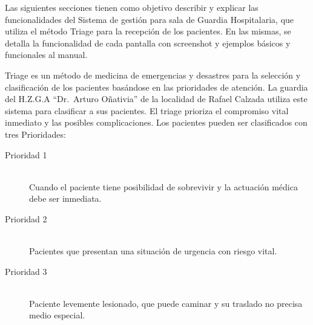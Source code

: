 Las siguientes secciones tienen como objetivo describir y explicar las funcionalidades del Sistema de gestión para sala de Guardia Hospitalaria, que utiliza el método Triage para la recepción de los pacientes. En las mismas, se detalla la funcionalidad de cada pantalla con screenshot y ejemplos básicos y funcionales al manual.

Triage es un método de medicina de emergencias y desastres para la selección y clasificación de los pacientes basándose en las prioridades de atención. La guardia del H.Z.G.A ``Dr.\ Arturo Oñativia'' de la localidad de Rafael Calzada utiliza este sistema para clasificar a sus pacientes. El triage prioriza el compromiso vital inmediato y las posibles complicaciones.
Los pacientes pueden ser clasificados con tres Prioridades:

\begin{description}
\item[Prioridad 1] \mbox{} \\ 
Cuando el paciente tiene posibilidad de sobrevivir y la actuación médica debe ser inmediata.
\item[Prioridad 2] \mbox{} \\ 
Pacientes que presentan una situación de urgencia con riesgo vital.
\item[Prioridad 3] \mbox{} \\ 
Paciente levemente lesionado, que puede caminar y su traslado no precisa medio especial.

\end{description}

